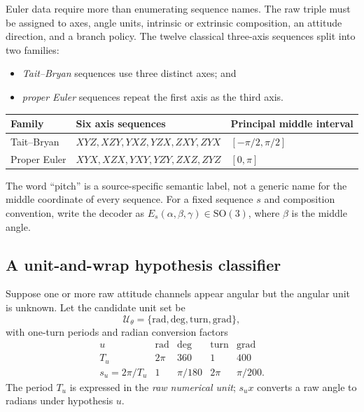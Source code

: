 \documentclass[11pt]{article}
\newcommand{\SO}{\mathrm{SO}(3)}
\begin{document}
    Euler data require more than enumerating sequence names. The raw triple must be assigned
    to axes, angle units, intrinsic or extrinsic composition, an attitude direction, and a
    branch policy. The twelve classical three-axis sequences split into two families:
    \begin{itemize}[nosep]
    \item \emph{Tait--Bryan} sequences use three distinct axes; and
    \item \emph{proper Euler} sequences repeat the first axis as the third axis.
    \end{itemize}
    \begin{center}
        \small
        \begin{tabular}{@{}lll@{}}
            \toprule
            Family       & Six axis sequences        & Principal middle interval \\
            \midrule
            Tait--Bryan  & $XYZ,XZY,YXZ,YZX,ZXY,ZYX$ & $[-\pi/2,\pi/2]$          \\
            Proper Euler & $XYX,XZX,YXY,YZY,ZXZ,ZYZ$ & $[0,\pi]$                 \\
            \bottomrule
        \end{tabular}
    \end{center}
    The word ``pitch'' is a source-specific semantic label, not a generic name for the
    middle coordinate of every sequence. For a fixed sequence $s$ and composition
    convention, write the decoder as
    $E_s(\alpha,\beta,\gamma)\in\SO$, where $\beta$ is the middle angle.

    \subsection{A unit-and-wrap hypothesis classifier}

    Suppose one or more raw attitude channels appear angular but the angular unit is unknown.
    Let the candidate unit set be
    \begin{equation}
        \mathcal U_\theta=\{\mathrm{rad},\mathrm{deg},\mathrm{turn},\mathrm{grad}\},
    \end{equation}
    with one-turn periods and radian conversion factors
    \begin{equation}
        \begin{array}{c|cccc}
            u & \mathrm{rad} & \mathrm{deg} & \mathrm{turn} & \mathrm{grad}\\
            \hline
            T_u & 2\pi & 360 & 1 & 400\\
            s_u=2\pi/T_u & 1 & \pi/180 & 2\pi & \pi/200.
        \end{array}
        \label{eq:unit-periods}
    \end{equation}
    The period $T_u$ is expressed in the \emph{raw numerical unit}; $s_u x$ converts a raw
    angle to radians under hypothesis $u$.
\end{document}
